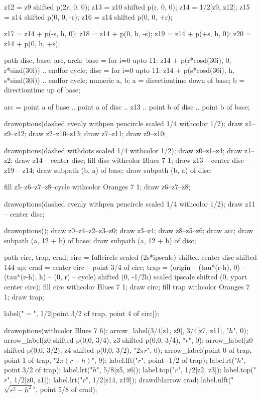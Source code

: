 \documentclass[oneside]{scrbook}
\begin{document}
z12 = z9 shifted p(2r, 0, 0);
z13 = z10 shifted p(r, 0, 0);
z14 = 1/2[z9, z12];
z15 = z14 shifted p(0, 0, -r);
z16 = z14 shifted p(0, 0, +r);

z17 = z14 + p(-s, h, 0);
z18 = z14 + p(0, h, -s);
z19 = z14 + p(+s, h, 0);
z20 = z14 + p(0, h, +s);

path disc, base, arc, arch;
base = for i=0 upto 11: z14 + p(r*cosd(30i), 0, r*sind(30i)) .. endfor cycle;
disc = for i=0 upto 11: z14 + p(s*cosd(30i), h, s*sind(30i)) .. endfor cycle;
numeric a, b;
a = directiontime down of base;
b = directiontime up of base;

arc = point a of base .. point a of disc .. z13 .. point b of disc .. point b of base;

drawoptions(dashed evenly withpen pencircle scaled 1/4 withcolor 1/2);
draw z1--z9--z12; draw z2--z10--z13; draw z7--z11;
draw z9--z10;

drawoptions(dashed withdots scaled 1/4 withcolor 1/2);
draw z0--z1--z4; draw z1--z2;
draw z14 -- center disc;
fill disc withcolor Blues 7 1;
draw z13 -- center disc -- z19 -- z14;
draw subpath (b, a) of base;
draw subpath (b, a) of disc;

fill z5--z6--z7--z8--cycle withcolor Oranges 7 1;
draw z6--z7--z8;

drawoptions(dashed evenly withpen pencircle scaled 1/4 withcolor 1/2);
draw z11 -- center disc;

drawoptions();
draw z0--z4--z2--z3--z0; draw z3--z4; draw z8--z5--z6;
draw arc;
draw subpath (a, 12 + b) of base;
draw subpath (a, 12 + b) of disc;



path circ, trap, crad;
circ = fullcircle scaled (2s*ipscale) shifted center disc shifted 144 up;
crad = center circ -- point 3/4 of circ;
trap = (origin -- (tau*(r-h), 0) -- (tau*(r-h), h) -- (0, r) -- cycle)
     shifted (0, -1/2h)
     scaled ipscale shifted (0, ypart center circ);
fill circ withcolor Blues 7 1;
draw circ;
fill trap withcolor Oranges 7 1; draw trap;

label("${}={}$", 1/2[point 3/2 of trap, point 4 of circ]);

drawoptions(withcolor Blues 7 6);
arrow_label(3/4[z1, z9], 3/4[z7, z11], "$h$", 0);
arrow_label(z0 shifted p(0,0,-3/4), z3 shifted p(0,0,-3/4), "$r$", 0);
arrow_label(z0 shifted p(0,0,-3/2), z4 shifted p(0,0,-3/2), "$2\pi r$", 0);
arrow_label(point 0 of trap, point 1 of trap, "$2\pi(r-h)$", 9);
label.lft("$r$", point -1/2 of trap);
label.rt("$h$", point 3/2 of trap);
label.lrt("$h$", 5/8[z5, z6]);
label.top("$r$", 1/2[z2, z3]);
label.top("$r$", 1/2[z0, z1]);
label.lrt("$r$", 1/2[z14, z19]);
drawdblarrow crad;
label.ulft("$\sqrt{r^2-h^2}$", point 5/8 of crad);
\end{document}
